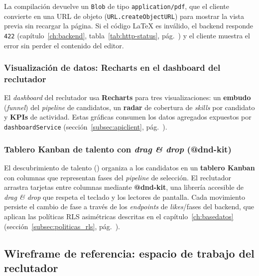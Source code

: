 \begin{AvisoNota}
La compilación devuelve un \texttt{Blob} de tipo \texttt{application/pdf}, que el cliente
convierte en una URL de objeto (\texttt{URL.createObjectURL}) para mostrar la vista previa
sin recargar la página. Si el código LaTeX es inválido, el backend responde \texttt{422}
(capítulo~\ref{ch:backend}, tabla~\ref{tab:http-status}, pág.~\pageref{tab:http-status}) y
el cliente muestra el error sin perder el contenido del editor.
\end{AvisoNota}

\subsubsection{Visualización de datos: Recharts en el dashboard del reclutador}
\label{subsubsec:recharts}

El \textit{dashboard} del reclutador usa \textbf{Recharts} para tres visualizaciones: un
\textbf{embudo} (\textit{funnel}) del \textit{pipeline} de candidatos, un \textbf{radar}
de cobertura de \textit{skills} por candidato y \textbf{KPIs} de actividad. Estas gráficas
consumen los datos agregados expuestos por \texttt{dashboardService}
(sección~\ref{subsec:apiclient}, pág.~\pageref{subsec:apiclient}).

\subsubsection{Tablero Kanban de talento con \textit{drag \& drop} (@dnd-kit)}
\label{subsubsec:kanban}

El descubrimiento de talento () organiza a los
candidatos en un \textbf{tablero Kanban} con columnas que representan fases del
\textit{pipeline} de selección. El reclutador arrastra tarjetas entre columnas mediante
\textbf{@dnd-kit}, una librería accesible de \textit{drag \& drop} que respeta el teclado
y los lectores de pantalla. Cada movimiento persiste el cambio de fase a través de los
\textit{endpoints} de \textit{likes}/fases del backend, que aplican las políticas RLS
asimétricas descritas en el capítulo~\ref{ch:basedatos}
(sección~\ref{subsec:politicas_rls}, pág.~\pageref{subsec:politicas_rls}).

\subsection{Wireframe de referencia: espacio de trabajo del reclutador}
\label{subsec:wireframe}

